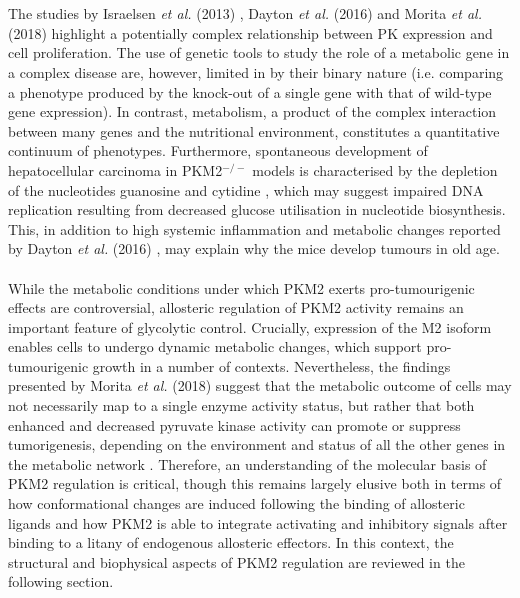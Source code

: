 %
%
\\\\
%
%
The studies by Israelsen \textit{et al.} (2013) \cite{Israelsen:2013aa}, Dayton \textit{et al.} (2016) \cite{Dayton:2016aa} and Morita \textit{et al.} (2018) \cite{Morita:2018aa} highlight a potentially complex relationship between PK expression and cell proliferation. The use of genetic tools to study the role of a metabolic gene in a complex disease are, however, limited in by their binary nature (i.e. comparing a phenotype produced by the knock-out of a single gene with that of wild-type gene expression). In contrast, metabolism, a product of the complex interaction between many genes and the nutritional environment, constitutes a quantitative continuum of phenotypes. Furthermore, spontaneous development of hepatocellular carcinoma in PKM2$^{-/-}$ models is characterised by the depletion of the nucleotides guanosine and cytidine \cite{Dayton:2016aa}, which may suggest impaired DNA replication resulting from decreased glucose utilisation in nucleotide biosynthesis. This, in addition to high systemic inflammation and metabolic changes reported by Dayton \textit{et al.} (2016) \cite{Dayton:2016aa}, may explain why the mice develop tumours in old age. 
%
%
\\\\
%
%
While the metabolic conditions under which PKM2 exerts pro-tumourigenic effects are controversial, allosteric regulation of PKM2 activity remains an important feature of glycolytic control. Crucially, expression of the M2 isoform enables cells to undergo dynamic metabolic changes, which support pro-tumourigenic growth in a number of contexts. Nevertheless, the findings presented by Morita \textit{et al.} (2018) \cite{Morita:2018aa} suggest that the metabolic outcome of cells may not necessarily map to a single enzyme activity status, but rather that both enhanced and decreased pyruvate kinase activity can promote or suppress tumorigenesis, depending on the environment and status of all the other genes in the metabolic network \cite{Allen:2018aa}. Therefore, an understanding of the molecular basis of PKM2 regulation is critical, though this remains largely elusive both in terms of how conformational changes are induced following the binding of allosteric ligands and how PKM2 is able to integrate activating and inhibitory signals after binding to a litany of endogenous allosteric effectors. In this context, the structural and biophysical aspects of PKM2 regulation are reviewed in the following section. 


